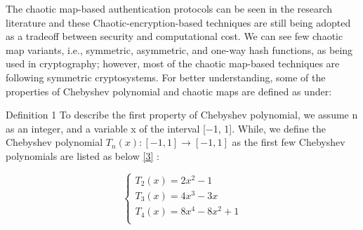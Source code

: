 \documentclass[preprint]{oscmjournal}
\begin{document}
The chaotic map-based authentication protocols can be seen in the research literature and these Chaotic-encryption-based techniques are still being adopted as a tradeoff between security and computational cost. We can see few chaotic map variants, i.e., symmetric, asymmetric, and one-way hash functions, as being used in cryptography; however, most of the chaotic map-based techniques are following symmetric cryptosystems. For better understanding, some of the properties of Chebyshev polynomial and chaotic maps are defined as under:

Definition 1 To describe the first property of Chebyshev polynomial, we assume n as an integer, and a variable x of the interval [−1, 1]. While, we define the Chebyshev polynomial \(T_{n}(x): [−1, 1] → [−1, 1]\) as the first few Chebyshev polynomials are listed as below \href{3}{[3]} :
\centering

   \[\left\{
   \begin{aligned}
   T_2(x) = 2x^2 - 1 \\
   T_3(x) = 4x^3 - 3x \\         \label{3}
   T_4(x) = 8x^4 -8x^2 + 1 \\
   \end{aligned}\right.
   \]
\end{document}
